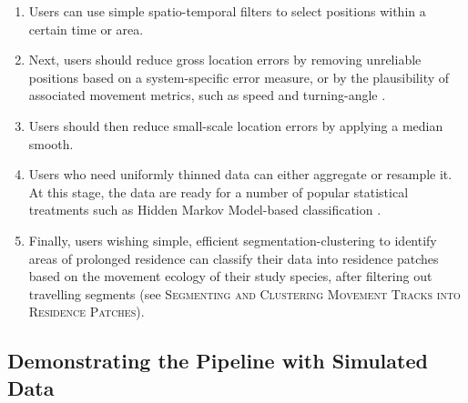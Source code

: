 \documentclass[10pt,paper=a4,headings=standardclasses
]{scrartcl}
\begin{document}
\begin{enumerate}
    
    
    
    \item Users can use simple spatio-temporal filters to select positions within a certain time or area.
    \item Next, users should reduce gross location errors by removing unreliable positions based on a system-specific error measure, or by the plausibility of associated movement metrics, such as speed and turning-angle \citep{seidel2018, calenge2009}.
    \item Users should then reduce small-scale location errors by applying a median smooth.
    \item Users who need uniformly thinned data can either aggregate or resample it.
    At this stage, the data are ready for a number of popular statistical treatments such as Hidden Markov Model-based classification \citep{michelot2016,langrock2012}.
    \item Finally, users wishing simple, efficient segmentation-clustering to identify areas of prolonged residence can classify their data into residence patches based on the movement ecology of their study species, after filtering out travelling segments (see \textsc{Segmenting and Clustering Movement Tracks into Residence Patches}).
    
\end{enumerate}

\subsection{Demonstrating the Pipeline with Simulated Data}
\end{document}
